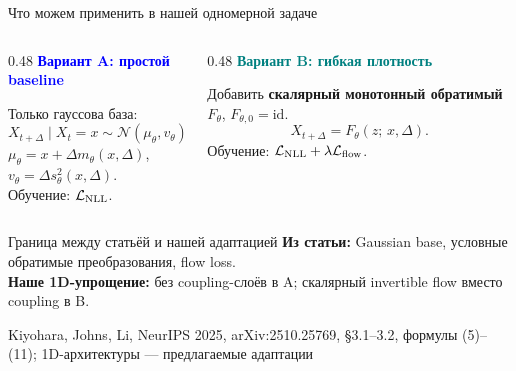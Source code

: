 \documentclass[10pt,aspectratio=169]{beamer}
\newcommand{\nsfsrc}[1]{\vfill{\tiny\color{graytext}Kiyohara, Johns, Li, NeurIPS 2025, arXiv:2510.25769, #1}}
\begin{document}
\begin{frame}{Что можем применить в нашей одномерной задаче}
\vspace{0.08cm}
\begin{columns}[T,onlytextwidth]
\begin{column}{0.48\textwidth}
\textcolor{blue}{\bfseries Вариант A: простой baseline}\par\vspace{0.13cm}
Только гауссова база:
\[
X_{t+\Delta}\mid X_t=x\sim\mathcal N(\mu_\theta,v_\theta),
\]
{\small $\mu_\theta=x+\Delta m_\theta(x,\Delta)$,\\[0.06cm]
$v_\theta=\Delta s_\theta^2(x,\Delta)$.}\\[0.07cm]
Обучение: $\mathcal L_{\rm NLL}$.
\end{column}
\begin{column}{0.48\textwidth}
\textcolor{teal}{\bfseries Вариант B: гибкая плотность}\par\vspace{0.13cm}
Добавить \textbf{скалярный монотонный обратимый} $F_\theta$, $F_{\theta,0}=\mathrm{id}$.
\[
X_{t+\Delta}=F_\theta(z;\,x,\Delta).
\]
Обучение: $\mathcal L_{\rm NLL}+\lambda\mathcal L_{\rm flow}$.
\end{column}
\end{columns}
\vspace{0.20cm}
\begin{block}{Граница между статьёй и нашей адаптацией}
\textbf{Из статьи:} Gaussian base, условные обратимые преобразования, flow loss.\\
\textbf{Наше 1D-упрощение:} без coupling-слоёв в A; скалярный invertible flow вместо coupling в B.
\end{block}
\nsfsrc{\S 3.1--3.2, формулы (5)--(11); 1D-архитектуры --- предлагаемые адаптации}
\end{frame}
\end{document}
